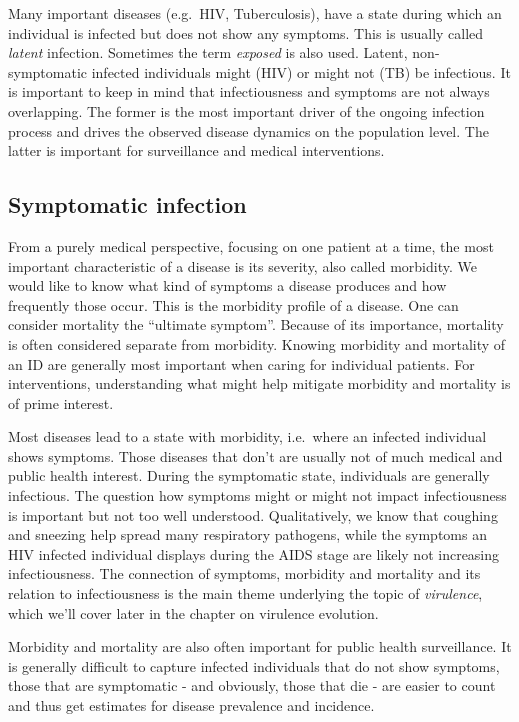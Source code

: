 \documentclass[]{book}
\theoremstyle{definition}
\theoremstyle{definition}
\theoremstyle{definition}
\theoremstyle{remark}
\begin{document}
Many important diseases (e.g.~HIV, Tuberculosis), have a state during
which an individual is infected but does not show any symptoms. This is
usually called \emph{latent} infection. Sometimes the term
\emph{exposed} is also used. Latent, non-symptomatic infected
individuals might (HIV) or might not (TB) be infectious. It is important
to keep in mind that infectiousness and symptoms are not always
overlapping. The former is the most important driver of the ongoing
infection process and drives the observed disease dynamics on the
population level. The latter is important for surveillance and medical
interventions.

\subsection{Symptomatic infection}\label{symptomatic-infection}

From a purely medical perspective, focusing on one patient at a time,
the most important characteristic of a disease is its severity, also
called morbidity. We would like to know what kind of symptoms a disease
produces and how frequently those occur. This is the morbidity profile
of a disease. One can consider mortality the ``ultimate symptom''.
Because of its importance, mortality is often considered separate from
morbidity. Knowing morbidity and mortality of an ID are generally most
important when caring for individual patients. For interventions,
understanding what might help mitigate morbidity and mortality is of
prime interest.

Most diseases lead to a state with morbidity, i.e.~where an infected
individual shows symptoms. Those diseases that don't are usually not of
much medical and public health interest. During the symptomatic state,
individuals are generally infectious. The question how symptoms might or
might not impact infectiousness is important but not too well
understood. Qualitatively, we know that coughing and sneezing help
spread many respiratory pathogens, while the symptoms an HIV infected
individual displays during the AIDS stage are likely not increasing
infectiousness. The connection of symptoms, morbidity and mortality and
its relation to infectiousness is the main theme underlying the topic of
\emph{virulence}, which we'll cover later in the chapter on virulence
evolution.

Morbidity and mortality are also often important for public health
surveillance. It is generally difficult to capture infected individuals
that do not show symptoms, those that are symptomatic - and obviously,
those that die - are easier to count and thus get estimates for disease
prevalence and incidence.
\end{document}
